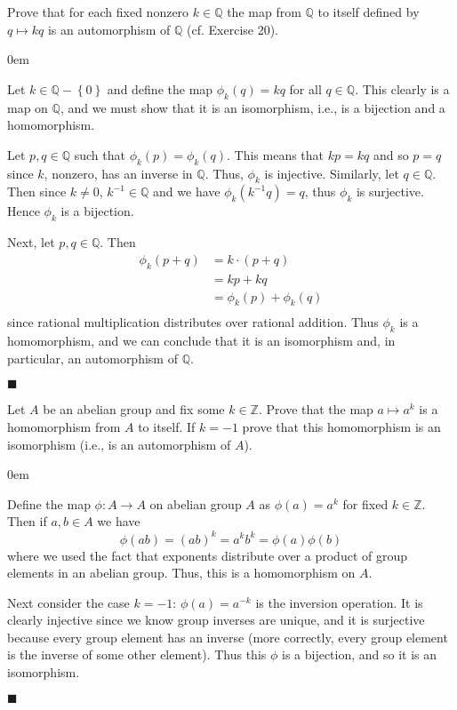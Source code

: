 \documentclass[12pt]{article}
\renewcommand{\qed}{\hfill$\blacksquare$}
\renewenvironment{proof}{\begin{addmargin}[1em]{0em}\begin{newproof}}{\end{newproof}\end{addmargin}\qed}
\newenvironment{problem}[2][Exercise]{\begin{trivlist}
\item[\hskip \labelsep {\bfseries #1}\hskip \labelsep {\bfseries #2.}]}{\end{trivlist}}
\begin{document}
\begin{problem}{1.6.21}
Prove that for each fixed nonzero $k\in \mathbb{Q}$ the map from $\mathbb{Q}$ to itself defined by $q\mapsto kq$ is an automorphism of $\mathbb{Q}$ (cf. Exercise 20).
\end{problem}
\begin{proof}
Let $k \in \mathbb{Q}-\left\{0\right\}$ and define the map $\phi_k\left(q\right)=kq$ for all $q\in \mathbb{Q}$. This clearly is a map on $\mathbb{Q}$, and we must show that it is an isomorphism, i.e., is a bijection and a homomorphism.

Let $p,q\in \mathbb{Q}$ such that $\phi_k\left(p\right)=\phi_k\left(q\right)$. This means that $kp=kq$ and so $p=q$ since $k$, nonzero, has an inverse in $\mathbb{Q}$. Thus, $\phi_k$ is injective. Similarly, let $q\in \mathbb{Q}$. Then since $k\neq 0$, $k^{-1}\in \mathbb{Q}$ and we have $\phi_k\left(k^{-1}q\right) = q$, thus $\phi_k$ is surjective. Hence $\phi_k$ is a bijection.

Next, let $p,q\in \mathbb{Q}$. Then
\begin{equation*}
    \begin{split}
        \phi_k\left(p + q\right) & = k\cdot \left(p + q\right) \\
        & = kp + kq \\
        & = \phi_k\left(p\right) + \phi_k\left(q\right) \\
    \end{split}
\end{equation*}
since rational multiplication distributes over rational addition. Thus $\phi_k$ is a homomorphism, and we can conclude that it is an isomorphism and, in particular, an automorphism of $\mathbb{Q}$.
\end{proof}






\begin{problem}{1.6.22}
Let $A$ be an abelian group and fix some $k\in \mathbb{Z}$. Prove that the map $a\mapsto a^k$ is a homomorphism from $A$ to itself. If $k=-1$ prove that this homomorphism is an isomorphism (i.e., is an automorphism of $A$).
\end{problem}
\begin{proof}
Define the map $\phi:A\rightarrow A$ on abelian group $A$ as $\phi\left(a\right)=a^k$ for fixed $k\in\mathbb{Z}$. Then if $a,b\in A$ we have
$$ \phi\left(ab\right)=\left(ab\right)^k = a^kb^k = \phi\left(a\right)\phi\left(b\right) $$
where we used the fact that exponents distribute over a product of group elements in an abelian group. Thus, this is a homomorphism on $A$.

Next consider the case $k=-1$: $\phi\left(a\right) = a^{-k}$ is the inversion operation. It is clearly injective since we know group inverses are unique, and it is surjective because every group element has an inverse (more correctly, every group element is the inverse of some other element). Thus this $\phi$ is a bijection, and so it is an isomorphism.
\end{proof}
\end{document}
